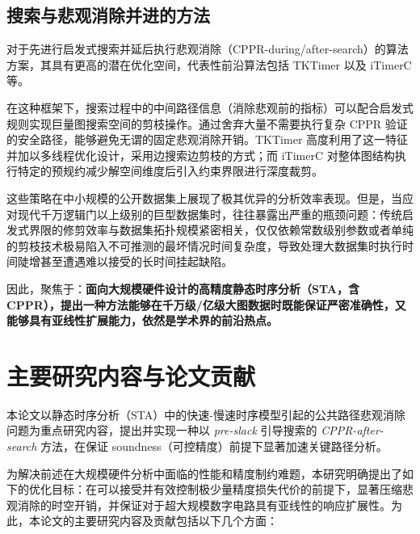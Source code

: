 \subsection{搜索与悲观消除并进的方法}
对于先进行启发式搜索并延后执行悲观消除（CPPR-during/after-search）的算法方案，其具有更高的潜在优化空间，代表性前沿算法包括 TKTimer \cite{TODO_tktimer} 以及 iTimerC \cite{TODO_itimerc} 等。

在这种框架下，搜索过程中的中间路径信息（消除悲观前的指标）可以配合启发式规则实现巨量图搜索空间的剪枝操作。通过舍弃大量不需要执行复杂 CPPR 验证的安全路径，能够避免无谓的固定悲观消除开销。TKTimer 高度利用了这一特征并加以多线程优化设计，采用边搜索边剪枝的方式；而 iTimerC 对整体图结构执行特定的预规约减少解空间维度后引入约束界限进行深度裁剪。

这些策略在中小规模的公开数据集上展现了极其优异的分析效率表现。但是，当应对现代千万逻辑门以上级别的巨型数据集时，往往暴露出严重的瓶颈问题：传统启发式界限的修剪效率与数据集拓扑规模紧密相关，仅仅依赖常数级别参数或者单纯的剪枝技术极易陷入不可推测的最坏情况时间复杂度，导致处理大数据集时执行时间陡增甚至遭遇难以接受的长时间挂起缺陷。

因此，聚焦于：\textbf{面向大规模硬件设计的高精度静态时序分析（STA，含 CPPR），提出一种方法能够在千万级/亿级大图数据时既能保证严密准确性，又能够具有亚线性扩展能力，依然是学术界的前沿热点。}

\section{主要研究内容与论文贡献}

本论文以静态时序分析（STA）中的快速-慢速时序模型引起的公共路径悲观消除问题为重点研究内容，提出并实现一种以 \textit{pre-slack} 引导搜索的 \textit{CPPR-after-search} 方法，在保证 soundness（可控精度）前提下显著加速关键路径分析。

为解决前述在大规模硬件分析中面临的性能和精度制约难题，本研究明确提出了如下的优化目标：在可以接受并有效控制极少量精度损失代价的前提下，显著压缩悲观消除的时空开销，并保证对于超大规模数字电路具有亚线性的响应扩展性。为此，本论文的主要研究内容及贡献包括以下几个方面：

